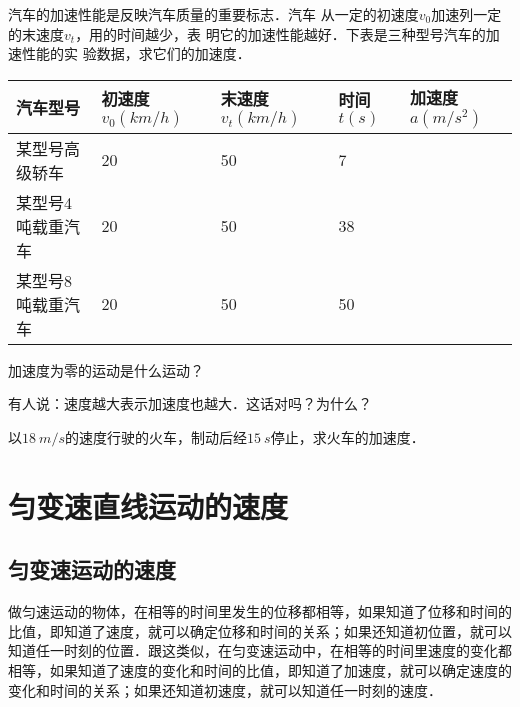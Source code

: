 \begin{Exercise}
	\begin{QsNum}
	    \item  汽车的加速性能是反映汽车质量的重要标志．汽车
	          从一定的初速度$v_0$加速列一定的末速度$v_t$，用的时间越少，表
	          明它的加速性能越好．下表是三种型号汽车的加速性能的实
	          验数据，求它们的加速度．
	          \begin{table}[H]
	              \centering
	              \begin{tabularx}{0.95\textwidth}{p{3.3cm}MMMM}
	                  \toprule[1.5pt]
	                  汽车型号      & 初速度$v_0(\si{km/h})$ & 末速度$v_t(\si{km/h})$ & 时间$t(\si{s})$ & 加速度$a(\si{m/s^2})$ \\
	                  \midrule
	                  某型号高级轿车   & 20                  & 50                  & 7                                  \\
	                  某型号4吨载重汽车 & 20                  & 50                  & 38                                 \\
	                  某型号8吨载重汽车 & 20                  & 50                  & 50                                 \\
	                  \bottomrule[1.5pt]
	              \end{tabularx}
	          \end{table}
	    \item  加速度为零的运动是什么运动？
	    \item  有人说：速度越大表示加速度也越大．这话对吗？为什么？
	    \item 以$\qty{18}{m/s}$的速度行驶的火车，制动后经$\qty{15}{s}$停止，求火车的加速度．
    \end{QsNum}
\end{Exercise}




\section{匀变速直线运动的速度}

\subsection{匀变速运动的速度}

做匀速运动的物体，在相等的时间里发生的位移都相等，如果知道了位移和时间的比值，即知道了速度，就可以确定位移和时间的关系；如果还知道初位置，就可以知道任一时刻的位置．跟这类似，在匀变速运动中，在相等的时间里速度的变化都相等，如果知道了速度的变化和时间的比值，即知道了加速度，就可以确定速度的变化和时间的关系；如果还知道初速度，就可以知道任一时刻的速度．

